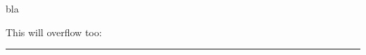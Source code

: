 \documentclass{memoir}
\begin{document}
bla



\bigskip

This will overflow too: \rule{1.5\textwidth}{2pt}
\end{document}
